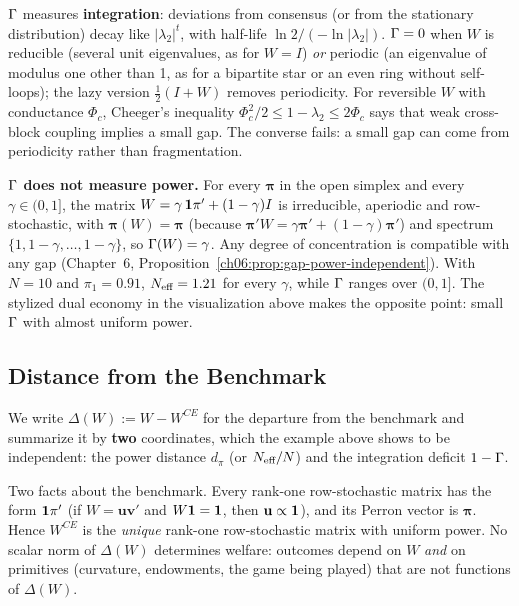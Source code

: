 \documentclass[../structural_economics_book.tex]{subfiles}
\begin{document}
$\Gamma$ measures \textbf{integration}: deviations from consensus (or from the stationary distribution) decay like $|\lambda_2|^t$, with half-life $\ln 2/(-\ln|\lambda_2|)$. $\Gamma = 0$ when $W$ is reducible (several unit eigenvalues, as for $W = I$) \textit{or} periodic (an eigenvalue of modulus one other than 1, as for a bipartite star or an even ring without self-loops); the lazy version $\frac{1}{2}(I + W)$ removes periodicity. For reversible $W$ with conductance $\Phi_c$, Cheeger's inequality $\Phi_c^2/2 \le 1 - \lambda_2 \le 2\Phi_c$ \citep[Thm.~13.14]{levin2009markov} says that weak cross-block coupling implies a small gap. The converse fails: a small gap can come from periodicity rather than fragmentation.

\textbf{$\Gamma$ does not measure power.} For every $\boldsymbol{\pi}$ in the open simplex and every $\gamma \in (0, 1]$, the matrix $W = \gamma\,\mathbf{1}\pi' + (1-\gamma)I$ is irreducible, aperiodic and row-stochastic, with $\boldsymbol{\pi}(W) = \boldsymbol{\pi}$ (because $\boldsymbol{\pi}'W = \gamma\boldsymbol{\pi}' + (1-\gamma)\boldsymbol{\pi}'$) and spectrum $\{1, 1-\gamma, \ldots, 1-\gamma\}$, so $\Gamma(W) = \gamma$. Any degree of concentration is compatible with any gap (Chapter~6, Proposition~\ref{ch06:prop:gap-power-independent}). With $N = 10$ and $\pi_1 = 0.91$, $N_{\text{eff}} = 1.21$ for every $\gamma$, while $\Gamma$ ranges over $(0, 1]$. The stylized dual economy in the visualization above makes the opposite point: small $\Gamma$ with almost uniform power.

\subsection{Distance from the Benchmark}

We write $\Delta(W) := W - W^{CE}$ for the departure from the benchmark and summarize it by \textbf{two} coordinates, which the example above shows to be independent: the power distance $d_\pi$ (or $N_{\text{eff}}/N$) and the integration deficit $1 - \Gamma$.

Two facts about the benchmark. Every rank-one row-stochastic matrix has the form $\mathbf{1}\pi'$ (if $W = \mathbf{u}\mathbf{v}'$ and $W\mathbf{1} = \mathbf{1}$, then $\mathbf{u} \propto \mathbf{1}$), and its Perron vector is $\boldsymbol{\pi}$. Hence $W^{CE}$ is the \textit{unique} rank-one row-stochastic matrix with uniform power. No scalar norm of $\Delta(W)$ determines welfare: outcomes depend on $W$ \textit{and} on primitives (curvature, endowments, the game being played) that are not functions of $\Delta(W)$.
\end{document}

